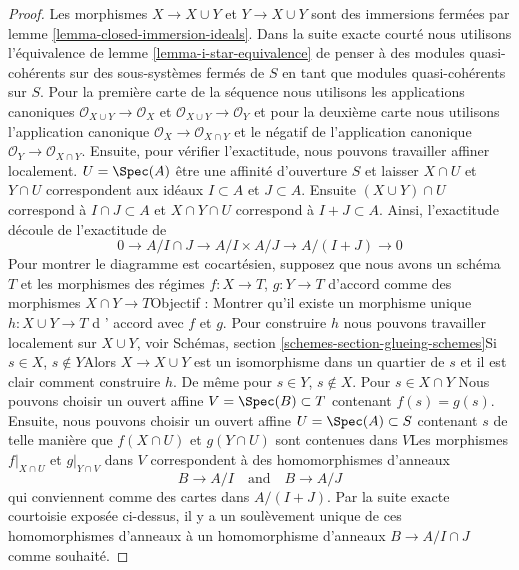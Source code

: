 \begin{proof}

Les morphismes $X \to X \cup Y$ et $Y \to X \cup Y$ sont des immersions fermées par lemme \ref{lemma-closed-immersion-ideals}. Dans la suite exacte courté nous utilisons l'équivalence de lemme \ref{lemma-i-star-equivalence} de penser à des modules quasi-cohérents sur des sous-systèmes fermés de $S$ en tant que modules quasi-cohérents sur $S$. Pour la première carte de la séquence nous utilisons les applications canoniques
$\mathcal{O}_{X \cup Y} \to \mathcal{O}_X$ et
$\mathcal{O}_{X \cup Y} \to \mathcal{O}_Y$
et pour la deuxième carte nous utilisons l'application canonique
$\mathcal{O}_X \to \mathcal{O}_{X \cap Y}$ et le négatif de l'application canonique
$\mathcal{O}_Y \to \mathcal{O}_{X \cap Y}$. Ensuite, pour vérifier l'exactitude, nous pouvons travailler affiner localement. $U = \Spec(A)$ être une affinité d'ouverture $S$ et laisser $X \cap U$ et $Y \cap U$
correspondent aux idéaux $I \subset A$ et $J \subset A$. Ensuite
$(X \cup Y) \cap U$ correspond à $I \cap J \subset A$
et $X \cap Y \cap U$ correspond à $I + J \subset A$. Ainsi, l'exactitude découle de l'exactitude de
$$
0 \to A/I \cap J \to A/I \times A/J \to A/(I + J) \to 0
$$
Pour montrer le diagramme est cocartésien, supposez que nous avons un schéma $T$
et les morphismes des régimes $f : X \to T$, $g : Y \to T$ d'accord comme des morphismes $X \cap Y \to T$Objectif : Montrer qu'il existe un morphisme unique $h : X \cup Y \to T$ d ' accord avec $f$ et $g$. Pour construire $h$ nous pouvons travailler localement sur $X \cup Y$, voir Schémas, section \ref{schemes-section-glueing-schemes}Si $s \in X$, $s \not \in Y$Alors $X \to X \cup Y$ est un isomorphisme dans un quartier de $s$ et il est clair comment construire $h$. De même pour $s \in Y$, $s \not \in X$. Pour $s \in X \cap Y$ Nous pouvons choisir un ouvert affine
$V = \Spec(B) \subset T$ contenant $f(s) = g(s)$. Ensuite, nous pouvons choisir un ouvert affine $U = \Spec(A) \subset S$
contenant $s$ de telle manière que $f(X \cap U)$ et $g(Y \cap U)$
sont contenues dans $V$Les morphismes $f|_{X \cap U}$
et $g|_{Y \cap V}$ dans $V$ correspondent à des homomorphismes d'anneaux
$$
B \to A/I
\quad\text{and}\quad
B \to A/J
$$
qui conviennent comme des cartes dans $A/(I + J)$. Par la suite exacte courtoisie exposée ci-dessus, il y a un soulèvement unique de ces homomorphismes d'anneaux à un homomorphisme d'anneaux $B \to A/I \cap J$ comme souhaité.

\end{proof}









